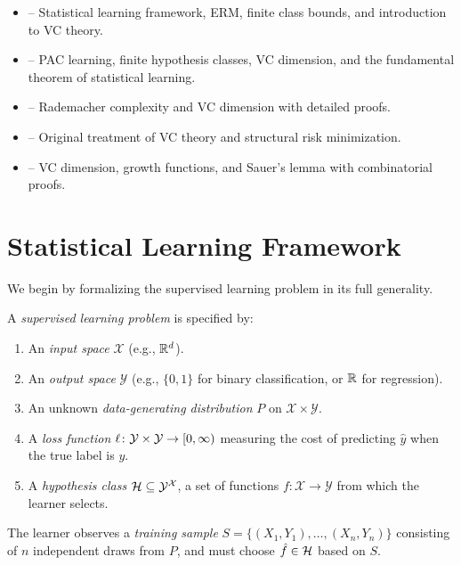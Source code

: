 \documentclass[11pt,a4paper]{article}
\begin{document}
\begin{itemize}
    \item \citet[Chapters 1--2]{bach2024} -- Statistical learning
    framework, ERM, finite class bounds, and introduction to VC theory.
    \item \citet[Chapters 2--6]{shalev2014} -- PAC learning, finite
    hypothesis classes, VC dimension, and the fundamental theorem of
    statistical learning.
    \item \citet[Chapters 3--4]{mohri2018} -- Rademacher complexity and
    VC dimension with detailed proofs.
    \item \citet[Chapters 6--7]{vapnik1998} -- Original treatment of VC
    theory and structural risk minimization.
    \item \citet[Chapter 12]{devroye1996} -- VC dimension, growth
    functions, and Sauer's lemma with combinatorial proofs.
\end{itemize}


\section{Statistical Learning Framework}
\label{sec:learning_framework}

We begin by formalizing the supervised learning problem in its full
generality.

\begin{definition}
\label{def:supervised_setup}
A \emph{supervised learning problem} is specified by:
\begin{enumerate}[nosep,label=(\roman*)]
    \item An \emph{input space} $\mathcal{X}$ (e.g., $\mathbb{R}^d$).
    \item An \emph{output space} $\mathcal{Y}$ (e.g., $\{0, 1\}$ for
    binary classification, or $\mathbb{R}$ for regression).
    \item An unknown \emph{data-generating distribution} $P$ on
    $\mathcal{X} \times \mathcal{Y}$.
    \item A \emph{loss function} $\ell \colon \mathcal{Y} \times
    \mathcal{Y} \to [0, \infty)$ measuring the cost of predicting
    $\hat{y}$ when the true label is $y$.
    \item A \emph{hypothesis class} $\mathcal{H} \subseteq
    \mathcal{Y}^{\mathcal{X}}$, a set of functions
    $f \colon \mathcal{X} \to \mathcal{Y}$ from which the learner
    selects.
\end{enumerate}
The learner observes a \emph{training sample}
$S = \{(X_1, Y_1), \ldots, (X_n, Y_n)\}$ consisting of $n$
independent draws from $P$, and must choose $\hat{f} \in \mathcal{H}$
based on $S$.
\end{definition}
\end{document}
